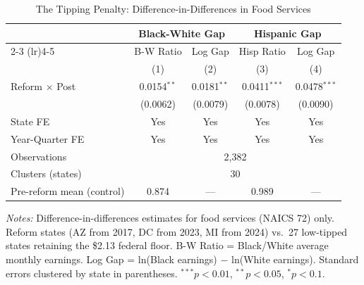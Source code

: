 \begin{table}[htbp]
\centering
\caption{The Tipping Penalty: Difference-in-Differences in Food Services}
\label{tab:dd}
\begin{threeparttable}
\begin{tabular}{lcccc}
\toprule
 & \multicolumn{2}{c}{Black-White Gap} & \multicolumn{2}{c}{Hispanic Gap} \\
\cmidrule(lr){2-3} \cmidrule(lr){4-5}
 & B-W Ratio & Log Gap & Hisp Ratio & Log Gap \\
 & (1) & (2) & (3) & (4) \\
\midrule
Reform $\times$ Post & 0.0154$^{**}$ & 0.0181$^{**}$ & 0.0411$^{***}$ & 0.0478$^{***}$ \\
 & (0.0062) & (0.0079) & (0.0078) & (0.0090) \\
\midrule
State FE & Yes & Yes & Yes & Yes \\
Year-Quarter FE & Yes & Yes & Yes & Yes \\
Observations & \multicolumn{4}{c}{2,382} \\
Clusters (states) & \multicolumn{4}{c}{30} \\
Pre-reform mean (control) & 0.874 & --- & 0.989 & --- \\
\bottomrule
\end{tabular}
\begin{tablenotes}[flushleft]\footnotesize
\item \textit{Notes:} Difference-in-differences estimates for food services (NAICS 72) only. Reform states (AZ from 2017, DC from 2023, MI from 2024) vs.\ 27 low-tipped states retaining the \$2.13 federal floor. B-W Ratio = Black/White average monthly earnings. Log Gap = ln(Black earnings) $-$ ln(White earnings). Standard errors clustered by state in parentheses. $^{***}p<0.01$, $^{**}p<0.05$, $^{*}p<0.1$.
\end{tablenotes}
\end{threeparttable}
\end{table}
